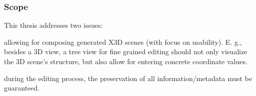 \subsubsection{Scope}\label{scope}

This thesis addresses two issues:

\begin{enumerate*}
\def\labelenumi{\arabic{enumi}.}
\item
  allowing for composing generated X3D scenes (with focus on usability).
  E. g., besides a 3D view, a tree view for fine grained editing should
  not only visualize the 3D scene's structure, but also allow for
  entering concrete coordinate values.
\item
  during the editing process, the preservation of all
  information/metadata must be guaranteed.
\end{enumerate*}
